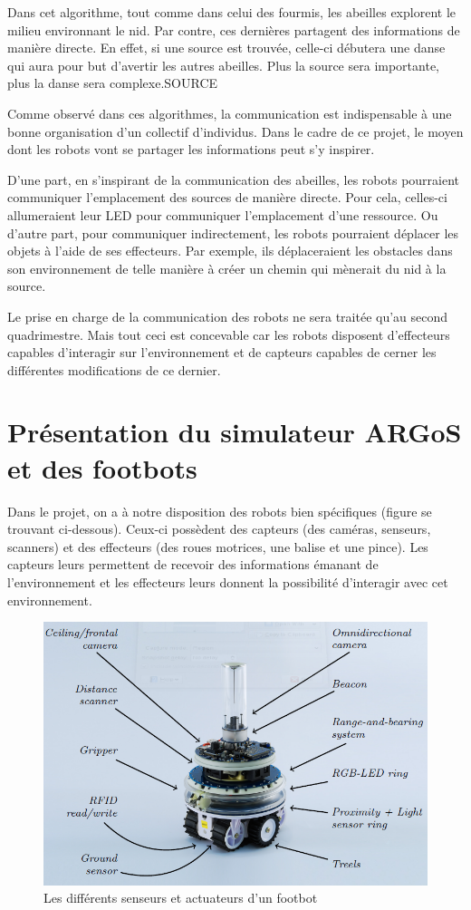 \documentclass[a4paper,11pt]{report}
\begin{document}
Dans cet algorithme, tout comme dans celui des fourmis, les abeilles explorent le milieu environnant le nid. Par contre, ces dernières partagent des informations de manière directe. En effet, si une source est trouvée, celle-ci débutera une danse qui aura pour but d'avertir les autres abeilles. Plus la source sera importante, plus la danse sera complexe.SOURCE

Comme observé dans ces algorithmes, la communication est indispensable à une bonne organisation d'un collectif d'individus. Dans le cadre de ce projet, le moyen dont les robots vont se partager les informations peut s'y inspirer.

D'une part, en s'inspirant de la communication des abeilles, les robots pourraient communiquer l'emplacement des sources de manière directe. Pour cela, celles-ci allumeraient leur LED pour communiquer l'emplacement d'une ressource. Ou d'autre part, pour communiquer indirectement, les robots pourraient déplacer les objets à l'aide de ses effecteurs. Par exemple, ils déplaceraient les obstacles dans son environnement de telle manière à créer un chemin qui mènerait du nid à la source.

Le prise en charge de la communication des robots ne sera traitée qu'au second quadrimestre. Mais tout ceci est concevable car les robots disposent d'effecteurs capables d'interagir sur l'environnement et de capteurs capables de cerner les différentes modifications de ce dernier.

\chapter{Présentation du simulateur ARGoS et des footbots\label{chap:argosFootbot}}

Dans le projet, on a à notre disposition des robots bien spécifiques (figure se trouvant ci-dessous). Ceux-ci possèdent des capteurs (des caméras, senseurs, scanners) et des effecteurs (des roues motrices, une balise et une pince). Les capteurs leurs permettent de recevoir des informations émanant de l'environnement et les effecteurs leurs donnent la possibilité d’interagir avec cet environnement.
\begin{figure}[h!]
   \includegraphics[width=\textwidth]{footbot.png}
      \caption{Les différents senseurs et actuateurs d'un footbot\cite{argosSite1}}
\end{figure}
\end{document}
